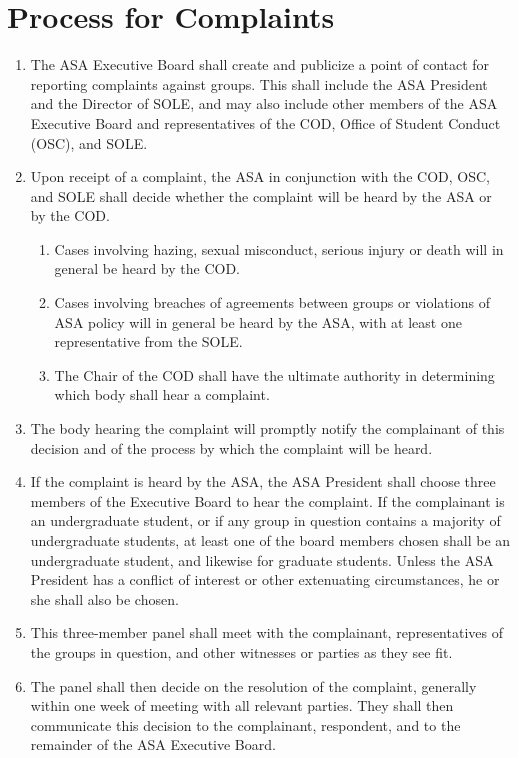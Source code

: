 \documentclass[12pt]{article}
\begin{document}
\section{Process for Complaints}
\label{asa_jud_complaint_process}

\begin{enumerate}
    \item The ASA Executive Board shall create and publicize a point of contact for reporting complaints
        against groups.
    This shall include the ASA President and the Director of SOLE, and may also include other members of
        the ASA Executive Board and representatives of the COD, Office of Student Conduct (OSC), and SOLE.
    
    \item Upon receipt of a complaint, the ASA in conjunction with the COD, OSC, and SOLE shall
        decide whether the complaint will be heard by the ASA or by the COD.
    \begin{enumerate}
        \item Cases involving hazing, sexual misconduct, serious injury or death will in general
            be heard by the COD.
        \item Cases involving breaches of agreements between groups or violations of ASA policy
            will in general be heard by the ASA, with at least one representative from the SOLE.
        \item The Chair of the COD shall have the ultimate authority in determining which body
            shall hear a complaint.
    \end{enumerate}

    \item The body hearing the complaint will promptly notify the complainant of this decision and of
        the process by which the complaint will be heard.
    \item If the complaint is heard by the ASA, the ASA President shall choose three members of the
        Executive Board to hear the complaint.
    If the complainant is an undergraduate student, or if any group in question contains a majority of
        undergraduate students, at least one of the board members chosen shall be an undergraduate student,
        and likewise for graduate students.
    Unless the ASA President has a conflict of interest or other extenuating circumstances, he or she shall
        also be chosen.
    
    \item This three-member panel shall meet with the complainant, representatives of the groups in question,
        and other witnesses or parties as they see fit.
    \item The panel shall then decide on the resolution of the complaint, generally within one week of meeting
        with all relevant parties.
    They shall then communicate this decision to the complainant, respondent, and to the remainder of the ASA Executive Board.
\end{enumerate}
\end{document}
